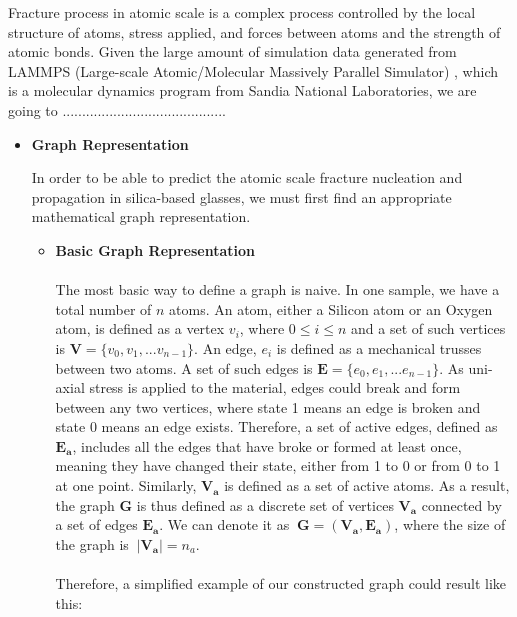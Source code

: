 Fracture process in atomic scale is a complex process controlled by the local structure of atoms, stress applied, and forces between atoms and the strength of atomic bonds. Given the large amount of simulation data generated from LAMMPS (Large-scale Atomic/Molecular Massively Parallel Simulator) \cite{PAMD}, which is a molecular dynamics program from Sandia National Laboratories, we are going to ..........................................

\begin{itemize}

\item \textbf{Graph Representation}


In order to be able to predict the atomic scale fracture nucleation and propagation in silica-based glasses, we must first find an appropriate mathematical graph representation. 
\begin{itemize}
    \item \textbf{Basic Graph Representation}
    \\
    \\
    The most basic way to define a graph is naive. In one sample, we have a total number of $n$ atoms. An atom, either a Silicon atom or an Oxygen atom, is defined as a vertex $v_i$, where $0 \leq i \leq n$ and a set of such vertices is $\mathbf{V} = \{v_0,v_1,...v_{n-1}\}$. An edge, $e_i$ is defined as a mechanical trusses between two atoms. A set of such edges is $\mathbf{E} = \{e_0,e_1,...e_{n-1}\}$. As uni-axial stress is applied to the material, edges could break and form between any two vertices, where state 1 means an edge is broken and state 0 means an edge exists. Therefore, a set of active edges, defined as $\mathbf{E_a}$, includes all the edges that have broke or formed at least once, meaning they have changed their state, either from 1 to 0 or from 0 to 1 at one point. Similarly, $\mathbf{V_a}$ is defined as a set of active atoms. As a result, the graph $\mathbf{G}$ is thus defined as a discrete set of vertices $\mathbf{V_a}$ connected by a set of edges $\mathbf{E_a}$. We can denote it as $\ \mathbf{G} = (\mathbf{V_a},\mathbf{E_a})$, where the size of the graph is $\ |\mathbf{V_a}| = n_a $.
    \\
    \\
    Therefore, a simplified example of our constructed graph could result like this:
    \bigskip
    \\
\end{itemize}
\end{itemize}
